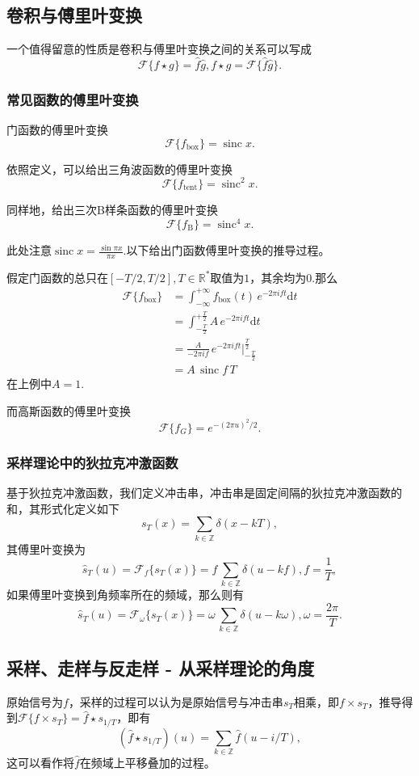 \documentclass{ctexart}
\begin{document}
	\subsection{卷积与傅里叶变换}
	一个值得留意的性质是卷积与傅里叶变换之间的关系可以写成
	\[\mathcal F\{f\star g\}=\hat f\hat g,f\star g=\mathcal F\{\hat f\hat g\}.\]

	\subsubsection{常见函数的傅里叶变换}
	门函数的傅里叶变换
	\[\mathcal F\{f_{\text{box}}\}=\operatorname{sinc}x.\]

	依照定义，可以给出三角波函数的傅里叶变换
	\[\mathcal F\{f_{\text{tent}}\}=\operatorname{sinc}^2x.\]

	同样地，给出三次B样条函数的傅里叶变换
	\[ \mathcal F\{ f_{\text{B}} \}=\operatorname{sinc}^4x. \]

	此处注意$\operatorname{sinc}x=\frac{\sin \pi x}{\pi x}$.以下给出门函数傅里叶变换的推导过程。

	假定门函数的总只在$[-T/2,T/2],T\in\mathbb{R}^*$取值为$1$，其余均为$0$.那么
	\[
		\begin{aligned}
			\mathcal F \{f_{\text{box}}\}
			&=\int_{-\infty}^{+\infty} f_{\text{box}}(t)\,e^{-2\pi ift}\mathrm dt \\
			&=\int_{-\frac T2}^{+\frac T2} A\,e^{-2\pi ift}\mathrm dt \\
			&=\frac A{-2\pi if}\,e^{-2\pi ift}\Big|^{\frac T2}_{-\frac T2} \\
			&=A\,\operatorname{sinc}{f\,T}
		\end{aligned}
	\]
	在上例中$A=1$.

	而高斯函数的傅里叶变换
	\[ \mathcal F\{f_G\}=e^{-(2\pi u)^2/2}. \]

	\subsubsection{采样理论中的狄拉克冲激函数}
	基于狄拉克冲激函数，我们定义冲击串，冲击串是固定间隔的狄拉克冲激函数的和，其形式化定义如下
	\[ s_T(x)=\sum_{k\in\mathbb Z}\delta(x-kT), \]
	其傅里叶变换为
	\[ \hat s_T(u)=\mathcal F_f \{s_T(x)\}=f\,\sum_{k\in\mathbb Z}\delta(u-kf),f=\frac1T, \]
	如果傅里叶变换到角频率所在的频域，那么则有
	\[ \hat s_T(u)=\mathcal F_\omega \{s_T(x)\}=\omega\,\sum_{k\in\mathbb Z}\delta(u-k\omega),\omega=\frac{2\pi}T. \]

	\subsection{采样、走样与反走样 - 从采样理论的角度}
	原始信号为$f$，采样的过程可以认为是原始信号与冲击串$s_T$相乘，即$f\times s_T$，推导得到$\mathcal F\{f\times s_T\}=\hat f\star s_{1/T}$，即有
	\[ (\hat f\star s_{1/T})(u)=\sum_{k\in\mathbb Z}\hat f(u-i/T), \]
	这可以看作将$\hat f$在频域上平移叠加的过程。
\end{document}
